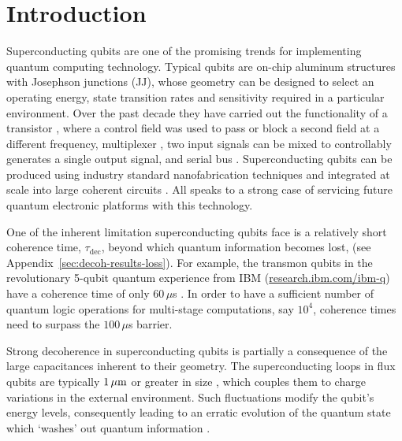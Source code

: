 
\section{Introduction}

\noindent Superconducting  qubits are  one of  the promising  trends for  implementing quantum
computing technology. Typical qubits are  on-chip aluminum structures with Josephson junctions
(JJ), whose geometry can be designed to select an operating energy, state transition rates and
sensitivity required in a particular environment.  Over  the past decade they have carried out
the functionality of a transistor \cite{Astafiev2010, hoi2011}, where a control field was used
to pass or block  a second field at a different  frequency, multiplexer \cite{honigl2018}, two
input signals can  be mixed to controllably  generates a single output signal,  and serial bus
\cite{shen2005}.    Superconducting   qubits  can   be   produced   using  industry   standard
nanofabrication   techniques  and   integrated   at  scale   into   large  coherent   circuits
\cite{johnson2010}.   All speaks  to  a strong  case of  servicing  future quantum  electronic
platforms with this technology.

One of the inherent limitation superconducting  qubits face is a relatively short coherence
time,   $\tau_{\text{dec}}$,    beyond   which    quantum   information   becomes    lost,   (see
Appendix~\ref{sec:decoh-results-loss}).  For example, the transmon qubits in the revolutionary
5-qubit                quantum                experience               from                IBM
(\href{http://www.research.ibm.com/ibm-q}{research.ibm.com/ibm-q})  have a  coherence time  of
only $  60\,\mu $s  \cite{linke2017}.  In  order to have  a sufficient  number of  quantum logic
operations for  multi-stage computations, say  $ 10^4 $, coherence  times need to  surpass the
$ 100\,\mu$s barrier.

Strong  decoherence  in  superconducting  qubits  is partially  a  consequence  of  the  large
capacitances  inherent to  their  geometry.   The superconducting  loops  in  flux qubits  are
typically  $  1\,\mu\text{m}$ or  greater  in  size \cite{hoi2011,  johnson2010},  which
couples them to  charge variations in the external environment.   Such fluctuations modify the
qubit's energy levels, consequently leading to an erratic evolution of the quantum state which
`washes' out quantum information \cite{devoret2008}.
 
